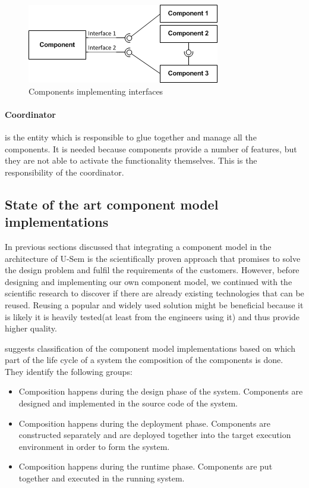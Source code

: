 	\begin{figure}[h!]
  		\centering
  		\includegraphics[scale=0.75]{plug-in/component-services.png}
  		\caption{Components implementing interfaces }
  		\label{fig_comp}
	\end{figure}

\paragraph{Coordinator}
	is the entity which is responsible to glue together and manage all the components. It is needed because components provide a number of features, but they are not able to activate the functionality themselves. This is the responsibility of the coordinator.

\subsection{State of the art component model implementations}

In previous sections discussed that integrating a component model in the architecture of U-Sem is the scientifically proven approach that promises to solve the design problem and fulfil the requirements of the customers. However, before designing and implementing our own component model, we continued with the scientific research to discover if there are already existing technologies that can be reused. Reusing a popular and widely used solution might be beneficial because it is likely it is heavily tested(at least from the engineers using it) and thus provide higher quality. 

\cite{Lau} suggests classification of the component model implementations based on which part of the life cycle of a system the composition of the components is done. They identify the following groups:

\begin{itemize}
	\item  Composition happens during the design phase of the system. Components are designed and implemented in the source code of the system.
	\item  Composition happens during the deployment phase. Components are constructed separately and are deployed together into the target execution environment in order to form the system.
	\item Composition happens during the runtime phase. Components are put together and executed in the running system.
\end{itemize}

